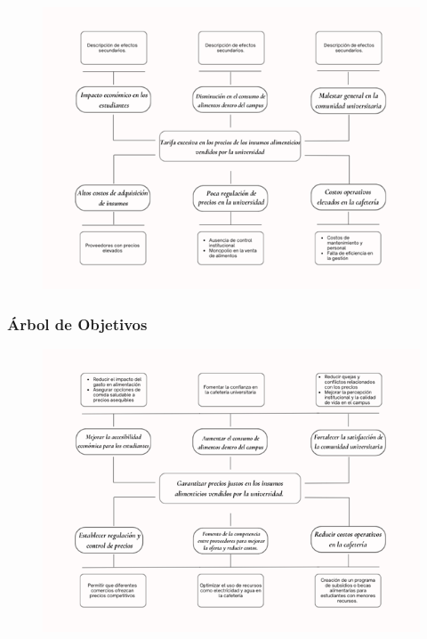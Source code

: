\documentclass[letterpaper, 11pt]{report}
\begin{document}
\begin{figure}[H]
      \begin{center}
            \includegraphics[width=\linewidth]{./Images/arbol_problema.png}
            \caption{}
      \end{center}
\end{figure}

\subsubsection{Árbol de Objetivos}

\begin{figure}[H]
      \begin{center}
            \includegraphics[width=\linewidth]{./Images/arbol_objetivo.png}
            \caption{}
      \end{center}
\end{figure}
\end{document}
